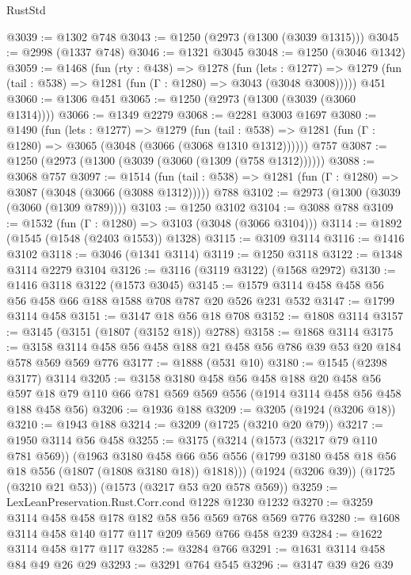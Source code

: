 \begin{lexlean}{RustStd}
\begin{coremodule}
@3039 := @1302 @748
@3043 := @1250 (@2973 (@1300 (@3039 @1315)))
@3045 := @2998 (@1337 @748)
@3046 := @1321 @3045
@3048 := @1250 (@3046 @1342)
@3059 := @1468
    (fun (rty : @438) =>
    @1278
      (fun (lets : @1277) =>
      @1279 (fun (tail : @538) => @1281 (fun (Γ : @1280) => @3043 (@3048 @3008)))))
    @451
@3060 := @1306 @451
@3065 := @1250 (@2973 (@1300 (@3039 (@3060 @1314))))
@3066 := @1349 @2279
@3068 := @2281 @3003 @1697
@3080 := @1490
    (fun (lets : @1277) =>
    @1279
      (fun (tail : @538) => @1281 (fun (Γ : @1280) => @3065 (@3048 (@3066 (@3068 @1310 @1312))))))
    @757
@3087 := @1250 (@2973 (@1300 (@3039 (@3060 (@1309 (@758 @1312))))))
@3088 := @3068 @757
@3097 := @1514
    (fun (tail : @538) => @1281 (fun (Γ : @1280) => @3087 (@3048 (@3066 (@3088 @1312)))))
    @788
@3102 := @2973 (@1300 (@3039 (@3060 (@1309 @789))))
@3103 := @1250 @3102
@3104 := @3088 @788
@3109 := @1532 (fun (Γ : @1280) => @3103 (@3048 (@3066 @3104)))
@3114 := @1892 (@1545 (@1548 (@2403 @1553)) @1328)
@3115 := @3109 @3114
@3116 := @1416 @3102
@3118 := @3046 (@1341 @3114)
@3119 := @1250 @3118
@3122 := @1348 @3114 @2279 @3104
@3126 := @3116 (@3119 @3122) (@1568 @2972)
@3130 := @1416 @3118 @3122 (@1573 @3045)
@3145 := @1579 @3114 @458 @458 @56 @56 @458 @66 @188 @1588 @708 @787 @20 @526 @231 @532
@3147 := @1799 @3114 @458
@3151 := @3147 @18 @56 @18 @708
@3152 := @1808 @3114
@3157 := @3145 (@3151 (@1807 (@3152 @18)) @2788)
@3158 := @1868 @3114
@3175 := @3158 @3114 @458 @56 @458 @188 @21 @458 @56 @786 @39 @53 @20 @184 @578 @569 @569 @776
@3177 := @1888 (@531 @10)
@3180 := @1545 (@2398 @3177) @3114
@3205 := @3158
    @3180
    @458
    @56
    @458
    @188
    @20
    @458
    @56
    @597
    @18
    @79
    @110
    @66
    @781
    @569
    @569
    @556
    (@1914 @3114 @458 @56 @458 @188 @458 @56)
@3206 := @1936 @188
@3209 := @3205 (@1924 (@3206 @18))
@3210 := @1943 @188
@3214 := @3209 (@1725 (@3210 @20 @79))
@3217 := @1950 @3114 @56 @458
@3255 := @3175
    (@3214
      (@1573 (@3217 @79 @110 @781 @569))
      (@1963
        @3180
        @458
        @66
        @56
        @556
        (@1799 @3180 @458 @18 @56 @18 @556 (@1807 (@1808 @3180 @18)) @1818)))
    (@1924 (@3206 @39))
    (@1725 (@3210 @21 @53))
    (@1573 (@3217 @53 @20 @578 @569))
@3259 := LexLeanPreservation.Rust.Corr.cond @1228 @1230 @1232
@3270 := @3259 @3114 @458 @458 @178 @182 @58 @56 @569 @768 @569 @776
@3280 := @1608 @3114 @458 @140 @177 @117 @209 @569 @766 @458 @239
@3284 := @1622 @3114 @458 @177 @117
@3285 := @3284 @766
@3291 := @1631 @3114 @458 @84 @49 @26 @29
@3293 := @3291 @764 @545
@3296 := @3147 @39 @26 @39

\end{coremodule}
\end{lexlean}
